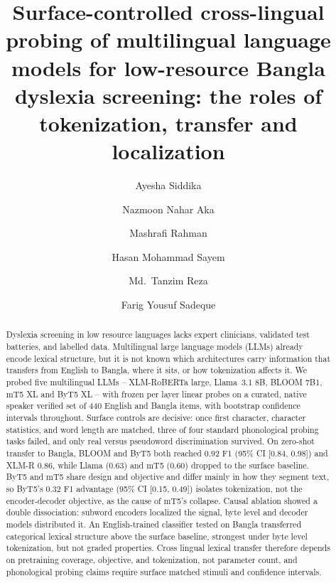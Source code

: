 \documentclass[preprint,12pt,authoryear]{elsarticle}
\begin{document}
\begin{frontmatter}

\title{Surface-controlled cross-lingual probing of multilingual language models for low-resource Bangla dyslexia screening: the roles of tokenization, transfer and localization}

\author[bracu]{Ayesha Siddika}
\author[bracu]{Nazmoon Nahar Aka}
\author[bracu]{Mashrafi Rahman}
\author[bracu]{Hasan Mohammad Sayem}
\author[bracu]{Md.\ Tanzim Reza}
\author[bracu]{Farig Yousuf Sadeque}



\begin{abstract}
Dyslexia screening in low resource languages lacks expert clinicians, validated test batteries, and labelled data. Multilingual large language models (LLMs) already encode lexical structure, but it is not known which architectures carry information that transfers from English to Bangla, where it sits, or how tokenization affects it. We probed five multilingual LLMs -- XLM-RoBERTa large, Llama~3.1 8B, BLOOM 7B1, mT5 XL and ByT5 XL -- with frozen per layer linear probes on a curated, native speaker verified set of 440 English and Bangla items, with bootstrap confidence intervals throughout. Surface controls are decisive: once first character, character statistics, and word length are matched, three of four standard phonological probing tasks failed, and only real versus pseudoword discrimination survived. On zero-shot transfer to Bangla, BLOOM and ByT5 both reached 0.92 F1 (95\% CI [0.84, 0.98]) and XLM-R 0.86, while Llama (0.63) and mT5 (0.60) dropped to the surface baseline. ByT5 and mT5 share design and objective and differ mainly in how they segment text, so ByT5's 0.32 F1 advantage (95\% CI [0.15, 0.49]) isolates tokenization, not the encoder-decoder objective, as the cause of mT5's collapse. Causal ablation showed a double dissociation: subword encoders localized the signal, byte level and decoder models distributed it. An English-trained classifier tested on Bangla transferred categorical lexical structure above the surface baseline, strongest under byte level tokenization, but not graded properties. Cross lingual lexical transfer therefore depends on pretraining coverage, objective, and tokenization, not parameter count, and phonological probing claims require surface matched stimuli and confidence intervals.
\end{abstract}


\end{frontmatter}
\end{document}
